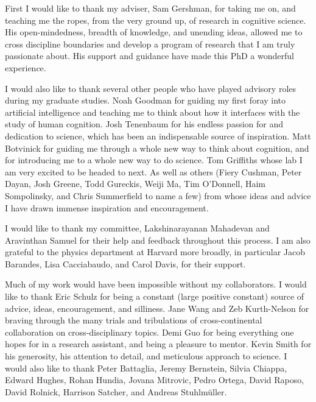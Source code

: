 

First I would like to thank my adviser, Sam Gershman, for taking me on, and teaching me the ropes, from the very ground up, of research in cognitive science. His open-mindedness, breadth of knowledge, and unending ideas, allowed me to cross discipline boundaries and develop a program of research that I am truly passionate about. His support and guidance have made this PhD a wonderful experience.

I would also like to thank several other people who have played advisory roles during my graduate studies. Noah Goodman for guiding my first foray into artificial intelligence and teaching me to think about how it interfaces with the study of human cognition. Josh Tenenbaum for his endless passion for and dedication to science, which has been an indispensable source of inspiration. Matt Botvinick for guiding me through a whole new way to think about cognition, and for introducing me to a whole new way to do science. Tom Griffiths whose lab I am very excited to be headed to next. As well as others (Fiery Cushman, Peter Dayan, Josh Greene, Todd Gureckis, Weiji Ma, Tim O'Donnell, Haim Sompolinsky, and Chris Summerfield to name a few) from whose ideas and advice I have drawn immense inspiration and encouragement.

I would like to thank my committee, Lakshinarayanan Mahadevan and Aravinthan Samuel for their help and feedback throughout this process. I am also grateful to the physics department at Harvard more broadly, in particular Jacob Barandes, Lisa Cacciabaudo, and Carol Davis, for their support.

Much of my work would have been impossible without my collaborators. I would like to thank Eric Schulz for being a constant (large positive constant) source of advice, ideas, encouragement, and silliness. Jane Wang and Zeb Kurth-Nelson for braving through the many trials and tribulations of cross-continental collaboration on cross-disciplinary topics. Demi Guo for being everything one hopes for in a research assistant, and being a pleasure to mentor. Kevin Smith for his generosity, his attention to detail, and meticulous approach to science. I would also like to thank Peter Battaglia, Jeremy Bernstein, Silvia Chiappa, Edward Hughes, Rohan Hundia,  Jovana Mitrovic, Pedro Ortega, David Raposo, David Rolnick, Harrison Satcher, and Andreas Stuhlmüller.

